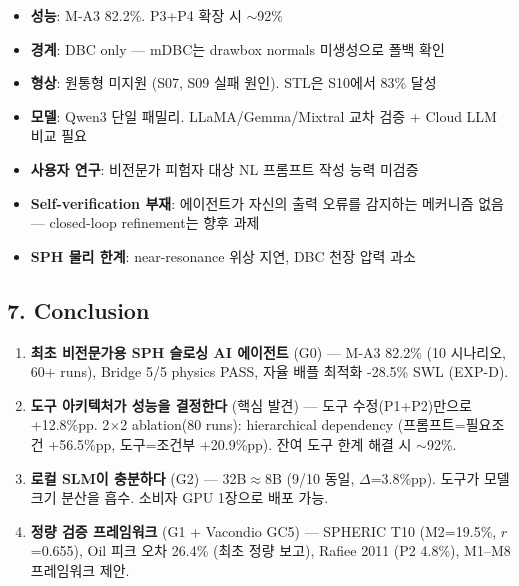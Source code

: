 \documentclass[12pt,a4paper]{article}
\begin{document}
\begin{itemize}[nosep]
\item \textbf{성능}: M-A3 82.2\%. P3+P4 확장 시 $\sim$92\%
\item \textbf{경계}: DBC only --- mDBC는 drawbox normals 미생성으로 폴백 확인
\item \textbf{형상}: 원통형 미지원 (S07, S09 실패 원인). STL은 S10에서 83\% 달성
\item \textbf{모델}: Qwen3 단일 패밀리. LLaMA/Gemma/Mixtral 교차 검증 + Cloud LLM 비교 필요
\item \textbf{사용자 연구}: 비전문가 피험자 대상 NL 프롬프트 작성 능력 미검증
\item \textbf{Self-verification 부재}: 에이전트가 자신의 출력 오류를 감지하는 메커니즘 없음 --- closed-loop refinement는 향후 과제
\item \textbf{SPH 물리 한계}: near-resonance 위상 지연, DBC 천장 압력 과소
\end{itemize}

\subsection{7. Conclusion}

\begin{enumerate}[nosep]
\item \textbf{최초 비전문가용 SPH 슬로싱 AI 에이전트} (G0) ---
M-A3 82.2\% (10 시나리오, 60+ runs),
Bridge 5/5 physics PASS,
자율 배플 최적화 -28.5\% SWL (EXP-D).

\item \textbf{도구 아키텍처가 성능을 결정한다} (핵심 발견) ---
도구 수정(P1+P2)만으로 +12.8\%pp.
2$\times$2 ablation(80 runs): hierarchical dependency
(프롬프트=필요조건 +56.5\%pp, 도구=조건부 +20.9\%pp).
잔여 도구 한계 해결 시 $\sim$92\%.

\item \textbf{로컬 SLM이 충분하다} (G2) ---
32B$\approx$8B (9/10 동일, $\Delta$=3.8\%pp).
도구가 모델 크기 분산을 흡수.
소비자 GPU 1장으로 배포 가능.

\item \textbf{정량 검증 프레임워크} (G1 + Vacondio GC5) ---
SPHERIC T10 (M2=19.5\%, $r$=0.655),
Oil 피크 오차 26.4\% (최초 정량 보고),
Rafiee 2011 (P2 4.8\%),
M1--M8 프레임워크 제안.
\end{enumerate}

% 
\end{document}
